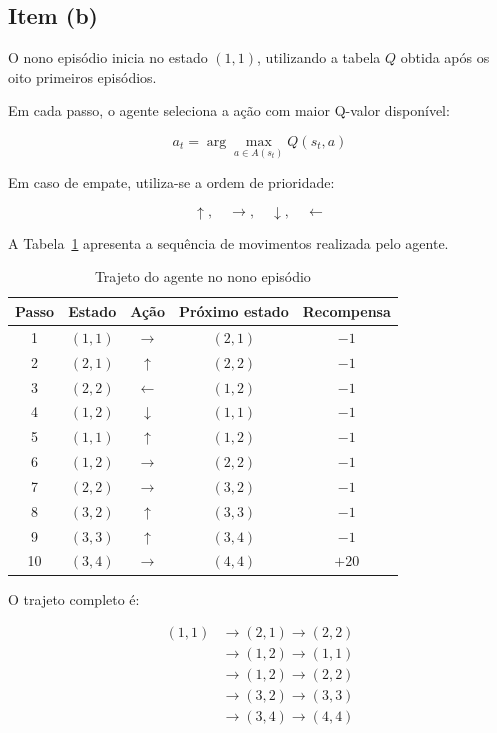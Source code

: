 \subsection{Item (b)}

O nono episódio inicia no estado $(1,1)$,
utilizando a tabela $Q$ obtida após
os oito primeiros episódios.

Em cada passo, o agente seleciona
a ação com maior Q-valor disponível:

\[
a_t=\arg\max_{a\in A(s_t)}Q(s_t,a)
\]

Em caso de empate, utiliza-se
a ordem de prioridade:

\[
\uparrow,\quad\rightarrow,\quad
\downarrow,\quad\leftarrow
\]

A Tabela~\ref{tab:trajeto_ep9} apresenta
a sequência de movimentos realizada
pelo agente.

\begin{table}[H]
\centering
\caption{Trajeto do agente no nono episódio}
\label{tab:trajeto_ep9}
\begin{tabular}{ccccc}
\toprule
Passo & Estado & Ação & Próximo estado & Recompensa\\
\midrule
1 & $(1,1)$ & $\rightarrow$ & $(2,1)$ & $-1$\\
2 & $(2,1)$ & $\uparrow$ & $(2,2)$ & $-1$\\
3 & $(2,2)$ & $\leftarrow$ & $(1,2)$ & $-1$\\
4 & $(1,2)$ & $\downarrow$ & $(1,1)$ & $-1$\\
5 & $(1,1)$ & $\uparrow$ & $(1,2)$ & $-1$\\
6 & $(1,2)$ & $\rightarrow$ & $(2,2)$ & $-1$\\
7 & $(2,2)$ & $\rightarrow$ & $(3,2)$ & $-1$\\
8 & $(3,2)$ & $\uparrow$ & $(3,3)$ & $-1$\\
9 & $(3,3)$ & $\uparrow$ & $(3,4)$ & $-1$\\
10 & $(3,4)$ & $\rightarrow$ & $(4,4)$ & $+20$\\
\bottomrule
\end{tabular}
\end{table}

O trajeto completo é:

\[
\begin{aligned}
(1,1)&\rightarrow(2,1)\rightarrow(2,2)\\
&\rightarrow(1,2)\rightarrow(1,1)\\
&\rightarrow(1,2)\rightarrow(2,2)\\
&\rightarrow(3,2)\rightarrow(3,3)\\
&\rightarrow(3,4)\rightarrow(4,4)
\end{aligned}
\]

